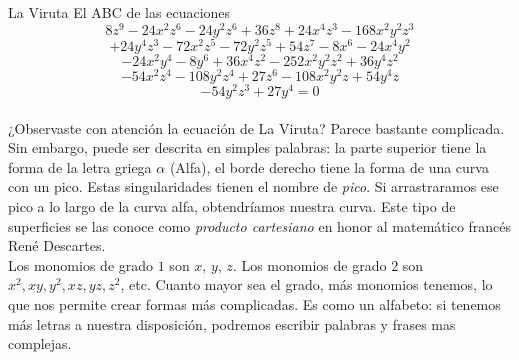 \begin{surferPage}[Viruta]{La Viruta}
El ABC de las ecuaciones
\[8z^9-24x^2z^6-24y^2z^6+36z^8+24x^4z^3-168x^2y^2z^3\]
\[+24y^4z^3-72x^2z^5-72y^2z^5+54z^7-8x^6-24x^4y^2\]
\[-24x^2y^4-8y^6 + 36x^4z^2-252x^2y^2z^2+36y^4z^2\]
\[- 54x^2z^4-108y^2z^4 + 27z^6-108x^2y^2z + 54y^4z\]
\[-54y^2z^3 + 27y^4 = 0\]\\
\vspace{0.25cm}
¿Observaste con atención la ecuación de La Viruta? Parece bastante complicada.
Sin embargo, puede ser descrita en simples palabras: la parte superior tiene la forma de la letra griega $\alpha$ (Alfa), el borde derecho tiene la forma de una curva con un pico. Estas singularidades tienen el nombre de {\it pico}. Si arrastraramos ese pico a lo largo de la curva alfa, obtendríamos nuestra curva. Este tipo de superficies se las conoce como {\it producto cartesiano} en honor al matemático francés Ren\'e Descartes.\\
\vspace{0.25cm}
Los monomios de grado $1$ son $x$, $y$, $z$. Los monomios de grado $2$ son $x^2, xy, y^2, xz, yz, z^2$, etc. Cuanto mayor sea el grado, más monomios tenemos, lo que nos permite crear formas más complicadas. Es como un alfabeto: si tenemos más letras a nuestra disposición, podremos escribir palabras y frases mas complejas.
\end{surferPage}
